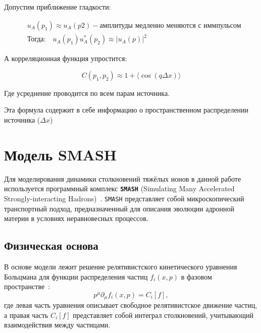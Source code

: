 \documentclass{extarticle}
\begin{document}
    Допустим приближение гладкости:

    \begin{align*}
        &u_A(p_1) \approx u_A(p2) 
            - \text{амплитуды медленно меняются с иммпульсом} \\
        & \text{Тогда:} 
            \quad u_A(p_1) u^{*}_{A}(p_2) \approx |u_A(p)|^2
    \end{align*}

    А корреляционная функция упростится:

    \begin{equation}
        C(p_1, p_2) \approx 1 + \langle \cos(q\Delta x)\rangle
    \end{equation}

    Где усреднение проводится по всем парам источника.

    Эта формула содержит в себе информацию о пространственном распределении источника ($\Delta x$) 
\newpage

\section{Модель SMASH}
    Для моделирования динамики столкновений тяжёлых ионов 
    в данной работе используется программный комплекс \textbf{\texttt{SMASH}} 
    (Simulating Many Accelerated Strongly-interacting Hadrons)~\cite{Weil:2016zrk}. 
    \texttt{SMASH} представляет собой микроскопический транспортный подход, 
    предназначенный для описания эволюции адронной материи в условиях неравновесных процессов.

    \subsection{Физическая основа}
        В основе модели лежит решение релятивистского кинетического уравнения Больцмана 
        для функции распределения частиц $f_i(x, p)$ в фазовом пространстве~\cite{Weil:2016zrk}:
        \begin{equation}
            p^\mu \partial_\mu f_i(x, p) = C_i[f],
        \end{equation}
        где левая часть уравнения описывает свободное релятивистское движение частиц, 
        а правая часть $C_i[f]$ представляет собой интеграл столкновений, 
        учитывающий взаимодействия между частицами.
\end{document}
